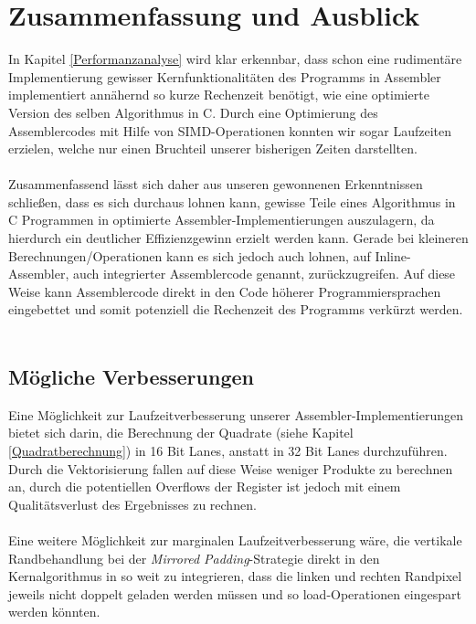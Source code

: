 \documentclass[course=asp]{aspdoc}
\begin{document}
\section{Zusammenfassung und Ausblick}
In Kapitel \ref{Performanzanalyse} wird klar erkennbar, dass schon eine rudimentäre Implementierung gewisser Kernfunktionalitäten des Programms in Assembler implementiert annähernd so kurze Rechenzeit benötigt, wie eine optimierte Version des selben Algorithmus in C. Durch eine Optimierung des Assemblercodes mit Hilfe von SIMD-Operationen konnten wir sogar Laufzeiten erzielen, welche nur einen Bruchteil unserer bisherigen Zeiten darstellten.\\\\
Zusammenfassend lässt sich daher aus unseren gewonnenen Erkenntnissen schließen, dass es sich durchaus lohnen kann, gewisse Teile eines Algorithmus in C Programmen in optimierte Assembler-Implementierungen auszulagern, da hierdurch ein deutlicher Effizienzgewinn erzielt werden kann. Gerade bei kleineren Berechnungen/Operationen kann es sich jedoch auch lohnen, auf Inline-Assembler, auch integrierter Assemblercode genannt, zurückzugreifen. Auf diese Weise kann Assemblercode direkt in den Code höherer Programmiersprachen eingebettet und somit potenziell die Rechenzeit des Programms verkürzt werden.\\\\
\subsection{Mögliche Verbesserungen}
Eine Möglichkeit zur Laufzeitverbesserung unserer Assembler-Implementierungen bietet sich darin, die Berechnung der Quadrate (siehe Kapitel \ref{Quadratberechnung}) in 16 Bit Lanes, anstatt in 32 Bit Lanes durchzuführen. Durch die Vektorisierung fallen auf diese Weise weniger Produkte zu berechnen an, durch die potentiellen Overflows der Register ist jedoch mit einem Qualitätsverlust des Ergebnisses zu rechnen.\\\\
Eine weitere Möglichkeit zur marginalen Laufzeitverbesserung wäre, die vertikale Randbehandlung bei der \textit{Mirrored Padding}-Strategie direkt in den Kernalgorithmus in so weit zu integrieren, dass die linken und rechten Randpixel jeweils nicht doppelt geladen werden müssen und so load-Operationen eingespart werden könnten.
\newpage

{}
\end{document}

